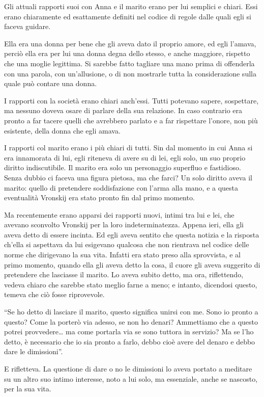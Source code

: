 Gli attuali rapporti suoi con Anna e il marito erano per lui semplici e chiari. Essi erano chiaramente ed esattamente definiti nel codice di regole dalle quali egli si faceva guidare. 

Ella era una donna per bene che gli aveva dato il proprio amore, ed egli l'amava, perciò ella era per lui una donna degna dello stesso, e anche maggiore, rispetto che una moglie legittima. Si sarebbe fatto tagliare una mano prima di offenderla con una parola, con un'allusione, o di non mostrarle tutta la considerazione sulla quale può contare una donna. 

I rapporti con la società erano chiari anch'essi. Tutti potevano sapere, sospettare, ma nessuno doveva osare di parlare della sua relazione. In caso contrario era pronto a far tacere quelli che avrebbero parlato e a far rispettare l'onore, non più esistente, della donna che egli amava. 

I rapporti col marito erano i più chiari di tutti. Sin dal momento in cui Anna si era innamorata di lui, egli riteneva di avere su di lei, egli solo, un suo proprio diritto indiscutibile. Il marito era solo un personaggio superfluo e fastidioso. Senza dubbio ci faceva una figura pietosa, ma che farci? Un solo diritto aveva il marito: quello di pretendere soddisfazione con l'arma alla mano, e a questa eventualità Vronskij era stato pronto fin dal primo momento. 

Ma recentemente erano apparsi dei rapporti nuovi, intimi tra lui e lei, che avevano sconvolto Vronskij per la loro indeterminatezza. Appena ieri, ella gli aveva detto di essere incinta. Ed egli aveva sentito che questa notizia e la risposta ch'ella si aspettava da lui esigevano qualcosa che non rientrava nel codice delle norme che dirigevano la sua vita. Infatti era stato preso alla sprovvista, e al primo momento, quando ella gli aveva detto la cosa, il cuore gli aveva suggerito di pretendere che lasciasse il marito. Lo aveva subito detto, ma ora, riflettendo, vedeva chiaro che sarebbe stato meglio farne a meno; e intanto, dicendosi questo, temeva che ciò fosse riprovevole. 

``Se ho detto di lasciare il marito, questo significa unirsi con me. Sono io pronto a questo? Come la porterò via adesso, se non ho denari? Ammettiamo che a questo potrei provvedere\ldots{} ma come portarla via se sono tuttora in servizio? Ma se l'ho detto, è necessario che io sia pronto a farlo, debbo cioè avere del denaro e debbo dare le dimissioni''. 

E rifletteva. La questione di dare o no le dimissioni lo aveva portato a meditare su un altro suo intimo interesse, noto a lui solo, ma essenziale, anche se nascosto, per la sua vita. 

